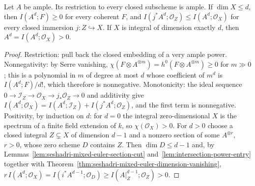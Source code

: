 \begin{theorem}
\label{thm:seshadri-ample-top-intersection-positive}
\leanok
{}
Let $A$ be ample. Its restriction to every closed subscheme is ample. If $\dim X\le d$, then
$I(A^d;F)\ge0$ for every coherent $F$, and $I(j^*A^d;\mathcal O_Z)\le I(A^d;\mathcal O_X)$
for every closed immersion $j:Z\hookrightarrow X$. If $X$ is integral of dimension exactly
$d$, then $A^d=I(A^d;\mathcal O_X)>0$.
\end{theorem}
\begin{proof}
Restriction: pull back the closed embedding of a very ample power. Nonnegativity: by Serre
vanishing, $\chi(F\otimes A^{\otimes m})=h^0(F\otimes A^{\otimes m})\ge0$ for $m\gg0$; this is
a polynomial in $m$ of degree at most $d$ whose coefficient of $m^d$ is
$I(A^d;F)/d!$, which therefore is nonnegative. Monotonicity: the ideal sequence
$0\to\mathcal I_Z\to\mathcal O_X\to j_*\mathcal O_Z\to0$ and additivity give
$I(A^d;\mathcal O_X)=I(A^d;\mathcal I_Z)+I(j^*A^d;\mathcal O_Z)$, and the first term is
nonnegative. Positivity, by induction on $d$: for $d=0$ the integral zero-dimensional $X$ is
the spectrum of a finite field extension of $k$, so $\chi(\mathcal O_X)>0$. For $d>0$ choose a
closed integral $Z\subsetneq X$ of dimension $d-1$ and a nonzero section of some
$A^{\otimes r}$, $r>0$, whose zero scheme $D$ contains $Z$. Then $\dim D\le d-1$ and, by
Lemmas~\ref{lem:seshadri-mixed-euler-section-cut} and~\ref{lem:intersection-power-entry}
together with Theorem~\ref{thm:seshadri-mixed-euler-dimension-vanishing},
$r\,I(A^d;\mathcal O_X)=I(i^*A^{d-1};\mathcal O_D)\ge I(A|_Z^{d-1};\mathcal O_Z)>0$.
\end{proof}

